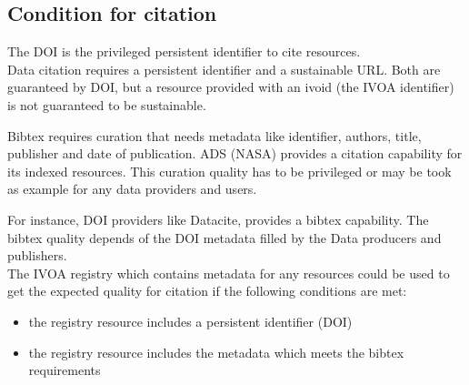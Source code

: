 \documentclass[11pt,a4paper]{ivoa}
\begin{document}
\subsection{Condition for citation}

The DOI is the privileged persistent identifier to cite resources.\\

Data citation requires a persistent identifier and a sustainable URL.
Both are guaranteed by DOI, but a resource provided with an ivoid (the IVOA identifier)
is not guaranteed to be sustainable.

Bibtex requires curation that needs metadata like identifier, authors, title, publisher and date of publication.
ADS (NASA) provides a citation capability for its indexed resources. This curation quality has to be privileged or may be took as example for any data providers and users.

For instance, DOI providers like Datacite, provides a bibtex capability. The bibtex quality depends of the DOI metadata filled by the Data producers and publishers.\\

The IVOA registry which contains metadata for any resources could be used to get the expected quality for citation if the following conditions are met:
\begin{itemize}
\item the registry resource includes a persistent identifier (DOI)
\item the registry resource includes the metadata which meets the bibtex requirements
\end{itemize}
\end{document}
